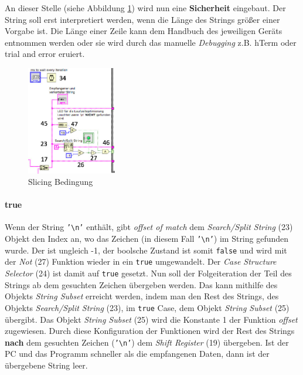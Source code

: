 \noindent An dieser Stelle (siehe Abbildung \ref{slicing_bedingung}) wird nun eine \textbf{Sicherheit} eingebaut. Der String soll erst interpretiert werden, wenn die Länge des Strings größer einer Vorgabe ist. Die Länge einer Zeile kann dem Handbuch des jeweiligen Geräts entnommen werden oder sie wird durch das manuelle \textit{Debugging} z.B. hTerm oder trial and error eruiert. 


\begin{figure}[h!] 
\centering
\includegraphics[width=0.35\textwidth]{Bilder/LabVIEW_serialport/slicing_bedingung.jpg}
\vspace{2pt}
\caption[Slicing Bedingung]{Slicing Bedingung}\label{slicing_bedingung}
\end{figure}

\paragraph*{true} Wenn der String \texttt{'\textbackslash n'} enthält, gibt \textit{offset of match} dem \textit{Search/Split String} (23) Objekt den Index an, wo das Zeichen (in diesem Fall \texttt{'\textbackslash n'}) im String gefunden wurde. Der ist ungleich -1, der boolsche Zustand ist somit \texttt{false} und wird mit der \textit{Not} (27) Funktion wieder in ein \texttt{true} umgewandelt. Der \textit{Case Structure Selector} (24) ist damit auf \texttt{true} gesetzt. Nun soll der Folgeiteration der Teil des Strings ab dem gesuchten Zeichen übergeben werden. Das kann mithilfe des Objekts \textit{String Subset} erreicht werden, indem man den Rest des Strings, des Objekts \textit{Search/Split String} (23), im \texttt{true} Case, dem Objekt \textit{String Subset} (25) übergibt. Das Objekt \textit{String Subset} (25) wird die Konstante 1 der Funktion \textit{offset} zugewiesen. Durch diese Konfiguration der Funktionen wird der Rest des Strings \textbf{nach} dem gesuchten Zeichen (\texttt{'\textbackslash n'}) dem \textit{Shift Register} (19) übergeben. Ist der PC und das Programm schneller als die empfangenen Daten, dann ist der übergebene String leer.

